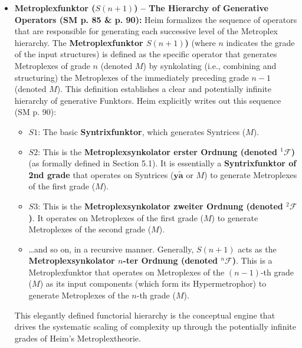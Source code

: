 \documentclass[12pt]{article}
\newcommand{\syntrix}{\bm{y\widetilde{a}}}
\def\metroplex#1#2{M}%
\newcommand{\metroplexsynkolator}[1]{{}^{#1}\mathcal{F}}
\newcommand{\metroplexfunktor}{S}
\begin{document}
\begin{itemize}
    \item \textbf{Metroplexfunktor (\( \metroplexfunktor(n+1) \)) – The Hierarchy of Generative Operators (SM p. 85 \& p. 90):}
    Heim formalizes the sequence of operators that are responsible for generating each successive level of the Metroplex hierarchy. The \textbf{Metroplexfunktor \( \metroplexfunktor(n+1) \))} (where \(n\) indicates the grade of the input structures) is defined as the specific operator that generates Metroplexes of grade \( n \) (denoted \( \metroplex{n}{} \)) by synkolating (i.e., combining and structuring) the Metroplexes of the immediately preceding grade \( n-1 \) (denoted \( \metroplex{n-1}{} \)). This definition establishes a clear and potentially infinite hierarchy of generative Funktors. Heim explicitly writes out this sequence (SM p. 90):
    \begin{itemize}
        \item \( S 1 \): The basic \textbf{Syntrixfunktor}, which generates Syntrices (\( \metroplex{0}{} \)). 
        \item \( S 2 \): This is the \textbf{Metroplexsynkolator erster Ordnung (denoted \( \metroplexsynkolator{1}{} \))} (as formally defined in Section 5.1). It is essentially a \textbf{Syntrixfunktor of 2nd grade} that operates on Syntrices (\( \syntrix \) or \( \metroplex{0}{} \)) to generate Metroplexes of the first grade (\( \metroplex{1}{} \)).
        \item \( S 3 \): This is the \textbf{Metroplexsynkolator zweiter Ordnung (denoted \( \metroplexsynkolator{2}{} \))}. It operates on Metroplexes of the first grade (\( \metroplex{1}{} \)) to generate Metroplexes of the second grade (\( \metroplex{2}{} \)).
        \item \dots and so on, in a recursive manner. Generally, \( \metroplexfunktor(n+1) \) acts as the \textbf{Metroplexsynkolator \( n \)-ter Ordnung (denoted \( \metroplexsynkolator{n}{} \))}. This is a Metroplexfunktor that operates on Metroplexes of the \( (n-1) \)-th grade (\( \metroplex{n-1}{} \)) as its input components (which form its Hypermetrophor) to generate Metroplexes of the \( n \)-th grade (\( \metroplex{n}{} \)).
    \end{itemize}
    This elegantly defined functorial hierarchy is the conceptual engine that drives the systematic scaling of complexity up through the potentially infinite grades of Heim's Metroplextheorie.


\end{itemize}
\end{document}
